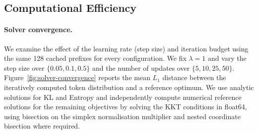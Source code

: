 \documentclass{article} %
\begin{document}
\begin{table}[!htbp]
\centering
\small
\setlength{\tabcolsep}{4pt}
\renewcommand{\arraystretch}{1.08}
\caption{Sample standard deviations across seeds 0, 42, and 1234
on MATH500 with Qwen2.5-7B and Top-$k$ support. Deviations for
pass@$k$ and SC@16 are in percentage points; SemDiv deviations
are shown in units of $10^{-3}$.}
\label{tab:seed-variance}
\end{table}

\subsection{Computational Efficiency}
\label{app:computational-efficiency}

\paragraph{Solver convergence.}
We examine the effect of the learning rate (step size) and iteration budget using the same 128 cached prefixes for every configuration. We fix $\lambda=1$ and vary the step size over $\{0.05,0.1,0.5\}$ and the number of updates over $\{5,10,25,50\}$. Figure~\ref{fig:solver-convergence} reports the mean $L_1$ distance between the iteratively computed token distribution and a reference optimum. We use analytic solutions for KL and Entropy and independently compute numerical reference solutions for the remaining objectives by solving the KKT conditions in float64, using bisection on the simplex normalisation multiplier and nested coordinate bisection where required.
\end{document}
